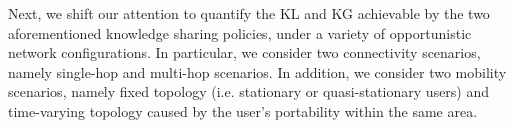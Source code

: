 \documentclass[12pt,epsf]{article}
\theoremstyle{definition}
\begin{document}
Next, we shift our attention to quantify the KL and KG achievable by the two aforementioned knowledge sharing policies, under a variety of opportunistic network configurations. In particular, we consider two connectivity scenarios, namely single-hop and multi-hop scenarios. In addition, we consider two mobility scenarios, namely fixed topology (i.e. stationary or quasi-stationary users) and time-varying topology caused by the user's portability within the same area. 

%
\vspace{-0.3 cm}
\end{document}
